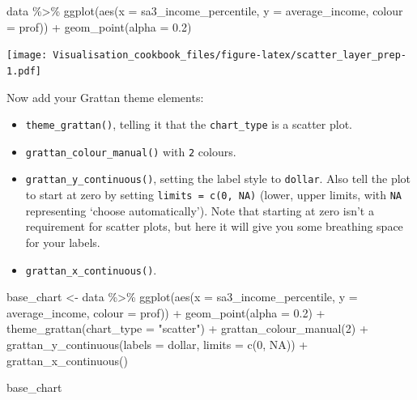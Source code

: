 \documentclass[
]{book}
\newenvironment{Shaded}{\begin{snugshade}}{\end{snugshade}}
\newcommand{\AttributeTok}[1]{\textcolor[rgb]{0.77,0.63,0.00}{#1}}
\newcommand{\ConstantTok}[1]{\textcolor[rgb]{0.00,0.00,0.00}{#1}}
\newcommand{\DecValTok}[1]{\textcolor[rgb]{0.00,0.00,0.81}{#1}}
\newcommand{\FloatTok}[1]{\textcolor[rgb]{0.00,0.00,0.81}{#1}}
\newcommand{\FunctionTok}[1]{\textcolor[rgb]{0.00,0.00,0.00}{#1}}
\newcommand{\NormalTok}[1]{#1}
\newcommand{\OtherTok}[1]{\textcolor[rgb]{0.56,0.35,0.01}{#1}}
\newcommand{\SpecialCharTok}[1]{\textcolor[rgb]{0.00,0.00,0.00}{#1}}
\newcommand{\StringTok}[1]{\textcolor[rgb]{0.31,0.60,0.02}{#1}}
\providecommand{\tightlist}{%
  \setlength{\itemsep}{0pt}\setlength{\parskip}{0pt}}
\begin{document}
\begin{Shaded}
\begin{Highlighting}[]
\NormalTok{data }\SpecialCharTok{\%\textgreater{}\%} 
  \FunctionTok{ggplot}\NormalTok{(}\FunctionTok{aes}\NormalTok{(}\AttributeTok{x =}\NormalTok{ sa3\_income\_percentile,}
             \AttributeTok{y =}\NormalTok{ average\_income,}
             \AttributeTok{colour =}\NormalTok{ prof)) }\SpecialCharTok{+}
  \FunctionTok{geom\_point}\NormalTok{(}\AttributeTok{alpha =} \FloatTok{0.2}\NormalTok{)}
\end{Highlighting}
\end{Shaded}

\texttt{[image: Visualisation\_cookbook\_files/figure-latex/scatter\_layer\_prep-1.pdf]}

Now add your Grattan theme elements:

\begin{itemize}
\tightlist
\item
  \texttt{theme\_grattan()}, telling it that the \texttt{chart\_type} is a scatter plot.
\item
  \texttt{grattan\_colour\_manual()} with \texttt{2} colours.
\item
  \texttt{grattan\_y\_continuous()}, setting the label style to \texttt{dollar}. Also tell the plot to start at zero by setting \texttt{limits\ =\ c(0,\ NA)} (lower, upper limits, with \texttt{NA} representing `choose automatically'). Note that starting at zero isn't a requirement for scatter plots, but here it will give you some breathing space for your labels.
\item
  \texttt{grattan\_x\_continuous()}.
\end{itemize}

\begin{Shaded}
\begin{Highlighting}[]
\NormalTok{base\_chart }\OtherTok{\textless{}{-}}\NormalTok{ data }\SpecialCharTok{\%\textgreater{}\%} 
  \FunctionTok{ggplot}\NormalTok{(}\FunctionTok{aes}\NormalTok{(}\AttributeTok{x =}\NormalTok{ sa3\_income\_percentile,}
             \AttributeTok{y =}\NormalTok{ average\_income,}
             \AttributeTok{colour =}\NormalTok{ prof)) }\SpecialCharTok{+}
  \FunctionTok{geom\_point}\NormalTok{(}\AttributeTok{alpha =} \FloatTok{0.2}\NormalTok{) }\SpecialCharTok{+} 
  \FunctionTok{theme\_grattan}\NormalTok{(}\AttributeTok{chart\_type =} \StringTok{"scatter"}\NormalTok{) }\SpecialCharTok{+} 
  \FunctionTok{grattan\_colour\_manual}\NormalTok{(}\DecValTok{2}\NormalTok{) }\SpecialCharTok{+} 
  \FunctionTok{grattan\_y\_continuous}\NormalTok{(}\AttributeTok{labels =}\NormalTok{ dollar, }
                       \AttributeTok{limits =} \FunctionTok{c}\NormalTok{(}\DecValTok{0}\NormalTok{, }\ConstantTok{NA}\NormalTok{)) }\SpecialCharTok{+} 
  \FunctionTok{grattan\_x\_continuous}\NormalTok{()}

\NormalTok{base\_chart}
\end{Highlighting}
\end{Shaded}
\end{document}
